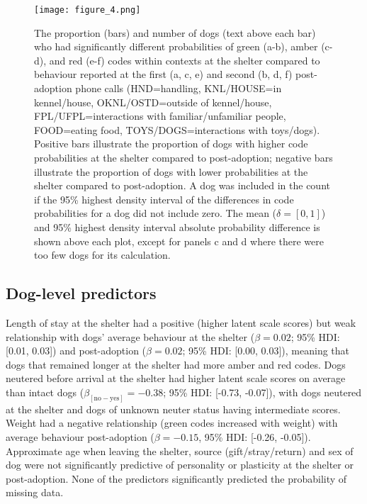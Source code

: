 \documentclass[fleqn,10pt]{wlscirep}
\begin{document}
\begin{figure}[t!]
  \centering
  \texttt{[image: figure\_4.png]}
  \caption{The proportion (bars) and number of dogs (text above each bar) who had significantly different probabilities of green (a-b), amber (c-d), and red (e-f) codes within contexts at the shelter compared to behaviour reported at the first (a, c, e) and second (b, d, f) post-adoption phone calls (HND=handling, KNL/HOUSE=in kennel/house, OKNL/OSTD=outside of kennel/house, FPL/UFPL=interactions with familiar/unfamiliar people, FOOD=eating food, TOYS/DOGS=interactions with toys/dogs). Positive bars illustrate the proportion of dogs with higher code probabilities at the shelter compared to post-adoption; negative bars illustrate the proportion of dogs with lower probabilities at the shelter compared to post-adoption. A dog was included in the count if the 95\% highest density interval of the differences in code probabilities for a dog did not include zero. The mean ($\delta = [0,1]$) and 95\% highest density interval absolute probability difference is shown above each plot, except for panels c and d where there were too few dogs for its calculation.}
  \label{fig_num_dogs}
\end{figure}

\subsection*{Dog-level predictors}
Length of stay at the shelter had a positive (higher latent scale scores) but weak relationship with dogs' average behaviour at the shelter ($\beta = 0.02$; 95\% HDI: [0.01, 0.03]) and post-adoption ($\beta = 0.02$; 95\% HDI: [0.00, 0.03]), meaning that dogs that remained longer at the shelter had more amber and red codes. Dogs neutered before arrival at the shelter had higher latent scale scores on average than intact dogs ($\beta_{[\text{no}-\text{yes}]} = -0.38$; 95\% HDI: [-0.73, -0.07]), with dogs neutered at the shelter and dogs of unknown neuter status having intermediate scores. Weight had a negative relationship (green codes increased with weight) with average behaviour post-adoption ($\beta = -0.15$, 95\% HDI: [-0.26, -0.05]). Approximate age when leaving the shelter, source (gift/stray/return) and sex of dog were not significantly predictive of personality or plasticity at the shelter or post-adoption. None of the predictors significantly predicted the probability of missing data.
\end{document}
